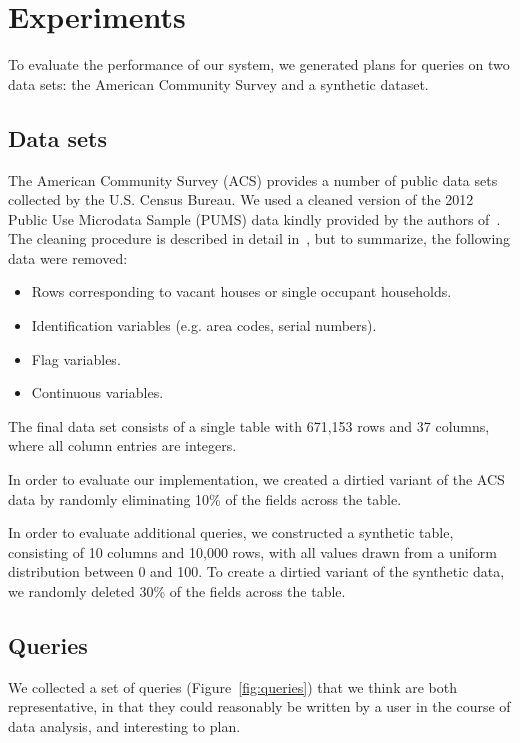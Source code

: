\section{Experiments}

To evaluate the performance of our system, we generated plans for queries on two data sets: the American Community Survey and a synthetic dataset.
\subsection{Data sets} \label{subsec:datasets}

The American Community Survey (ACS) provides a number of public data sets collected by the U.S. Census Bureau.
We used a cleaned version of the 2012 Public Use Microdata Sample (PUMS) data kindly provided by the authors of~\cite{akande2015empirical}.
The cleaning procedure is described in detail in~\cite{akande2015empirical}, but to summarize, the following data were removed:
\begin{itemize}
\item Rows corresponding to vacant houses or single occupant households.
\item Identification variables (e.g. area codes, serial numbers).
\item Flag variables.
\item Continuous variables.
\end{itemize}
The final data set consists of a single table with 671,153 rows and 37 columns, where all column entries are integers.

In order to evaluate our implementation, we created a dirtied variant of the ACS data by randomly eliminating
10\% of the fields across the table.

In order to evaluate additional queries, we constructed a synthetic table, consisting of 10 columns and 10,000 rows, with
all values drawn from a uniform distribution between 0 and 100. To create a dirtied variant of the synthetic data, we randomly deleted 30\% of the fields
across the table.

\subsection{Queries}

We collected a set of queries (Figure~\ref{fig:queries}) that we think are both representative, in that they could reasonably be written by a user in the course of data analysis, and interesting to plan.

